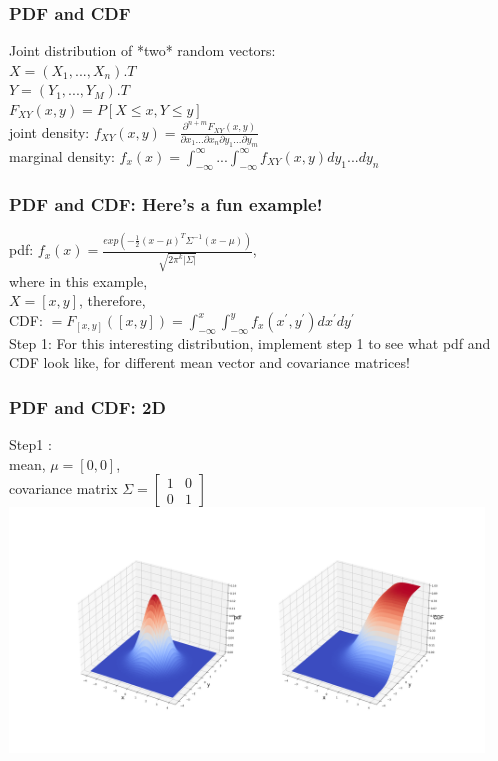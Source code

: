 \documentclass{beamer}
\begin{document}
\begin{frame}
\frametitle{PDF and CDF}
Joint distribution of *two* random vectors:\newline\\
$X= (X_1,...,X_n).T$\newline\\
$Y = (Y_1,...,Y_M).T$\newline\\
$F_{XY}(x,y) = P[X\le x,Y\le y]$\newline\\
joint density: $f_{XY}(x,y) = \frac{\partial^{n+m}F_{XY}(x,y)}{\partial{x_1}...\partial{x_n}\partial{y_1}...\partial{y_m}}$\newline\\
marginal density: $f_x(x)=\int_{-\infty}^{\infty}...\int_{-\infty}^{\infty} f_{XY}(x,y)dy_1...dy_n $\newline\\

\end{frame}



\begin{frame}
\frametitle{PDF and CDF: Here's a fun example!}
pdf: $f_x (x) = \frac{exp(-\frac{1}{2}(x-\mu)^T\Sigma^{-1} (x-\mu))}{\sqrt{{2\pi}^k|\Sigma|}}$, \newline\\
where in this example,\newline\\
$ X=[x,y]$, therefore,\newline\\
CDF: $=F_{[x,y]}([x,y]) = \int_{-\infty}^{x}\int_{-\infty}^{y} f_x(x^{'},y^{'})dx^{'}dy^{'} $\newline\\

Step 1:
For this interesting distribution, implement step 1 to see what pdf and CDF look like, for different mean vector and covariance matrices!
\end{frame}

\begin{frame}
\frametitle{PDF and CDF: 2D}
Step1 :
\\mean, $\mu = [0,0]$,\\
covariance matrix $\Sigma = \begin{bmatrix}
    1 & 0 \\
    0&1
\end{bmatrix}$\newline\\
\includegraphics[height=6.5cm]{2D-1.png}
\end{frame}
\end{document}
